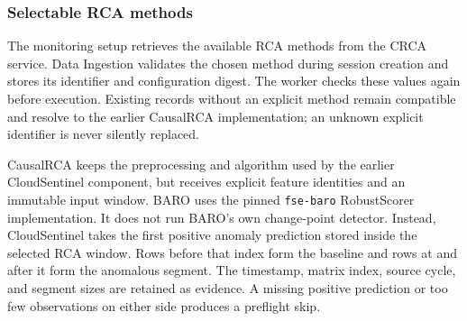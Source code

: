 \subsubsection{Selectable RCA methods}

The monitoring setup retrieves the available RCA methods from the CRCA service. Data Ingestion validates the chosen method during session creation and stores its identifier and configuration digest. The worker checks these values again before execution. Existing records without an explicit method remain compatible and resolve to the earlier CausalRCA implementation; an unknown explicit identifier is never silently replaced.

\begin{table}[H]
    \centering
    \caption{Implemented monitoring RCA methods and their different contracts.}
    \label{tab:monitoring_rca_methods}
\end{table}

CausalRCA keeps the preprocessing and algorithm used by the earlier CloudSentinel component, but receives explicit feature identities and an immutable input window. BARO uses the pinned \texttt{fse-baro} RobustScorer implementation. It does not run BARO's own change-point detector. Instead, CloudSentinel takes the first positive anomaly prediction stored inside the selected RCA window. Rows before that index form the baseline and rows at and after it form the anomalous segment. The timestamp, matrix index, source cycle, and segment sizes are retained as evidence. A missing positive prediction or too few observations on either side produces a preflight skip.

